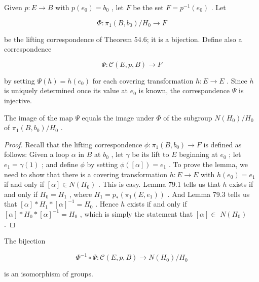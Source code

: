 \begin{definition} Given \(p : E \rightarrow  B\) with \(p\left( {e}_{0}\right)  = {b}_{0}\) , let \(F\) be the set \(F = {p}^{-1}\left( {e}_{0}\right)\) . Let

\[
\Phi  : {\pi }_{1}\left( {B,{b}_{0}}\right) /{H}_{0} \rightarrow  F
\]

be the lifting correspondence of Theorem 54.6; it is a bijection. Define also a correspondence

\[
\Psi  : \mathcal{C}\left( {E,p,B}\right)  \rightarrow  F
\]

by setting \(\Psi \left( h\right)  = h\left( {e}_{0}\right)\) for each covering transformation \(h : E \rightarrow  E\) . Since \(h\) is uniquely determined once its value at \({e}_{0}\) is known, the correspondence \(\Psi\) is injective.
\end{definition}

\begin{lemma} The image of the map \(\Psi\) equals the image under \(\Phi\) of the subgroup \(N\left( {H}_{0}\right) /{H}_{0}\) of \({\pi }_{1}\left( {B,{b}_{0}}\right) /{H}_{0}\) .
\end{lemma}

\begin{proof}Recall that the lifting correspondence \(\phi  : {\pi }_{1}\left( {B,{b}_{0}}\right)  \rightarrow  F\) is defined as follows: Given a loop \(\alpha\) in \(B\) at \({b}_{0}\) , let \(\gamma\) be its lift to \(E\) beginning at \({e}_{0}\) ; let \({e}_{1} = \gamma \left( 1\right)\) ; and define \(\phi\) by setting \(\phi \left( \left\lbrack  \alpha \right\rbrack  \right)  = {e}_{1}\) . To prove the lemma, we need to show that there is a covering transformation \(h : E \rightarrow  E\) with \(h\left( {e}_{0}\right)  = {e}_{1}\) if and only if \(\left\lbrack  \alpha \right\rbrack \in  N\left( {H}_{0}\right)\) .
This is easy. Lemma 79.1 tells us that \(h\) exists if and only if \({H}_{0} = {H}_{1}\) , where \({H}_{1} = {p}_{ * }\left( {{\pi }_{1}\left( {E,{e}_{1}}\right) }\right)\) . And Lemma 79.3 tells us that \(\left\lbrack  \alpha \right\rbrack * {H}_{1} * {\left\lbrack  \alpha \right\rbrack  }^{-1} = {H}_{0}\) . Hence \(h\) exists if and only if \(\left\lbrack  \alpha \right\rbrack * {H}_{0} * {\left\lbrack  \alpha \right\rbrack  }^{-1} = {H}_{0}\) , which is simply the statement that \(\left\lbrack  \alpha \right\rbrack \in\)  \(N\left( {H}_{0}\right)\) .
\end{proof}
\begin{theorem} The bijection

\[
{\Phi }^{-1} \circ  \Psi  : \mathcal{C}\left( {E,p,B}\right)  \rightarrow  N\left( {H}_{0}\right) /{H}_{0}
\]

is an isomorphism of groups.
\end{theorem}

